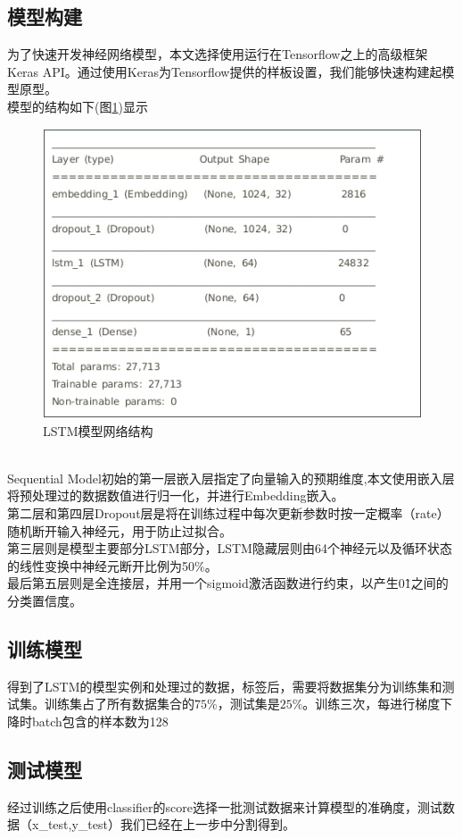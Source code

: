 \subsection{模型构建}
为了快速开发神经网络模型，本文选择使用运行在Tensorflow之上的高级框架Keras API。通过使用Keras为Tensorflow提供的样板设置，我们能够快速构建起模型原型。
\\\indent{}模型的结构如下(图\ref{fig:LSTM})显示
\begin{figure}[!h]
    \setlength{\abovecaptionskip}{0.cm}
    \setlength{\belowcaptionskip}{-0.cm}
    \centering
     \includegraphics[scale=0.65]{Figs/lstm.png}
    \caption{LSTM模型网络结构}
    \label{fig:LSTM}
\end{figure}
\\\indent{}Sequential Model初始的第一层嵌入层指定了向量输入的预期维度,本文使用嵌入层将预处理过的数据数值进行归一化，并进行Embedding嵌入。
\\\indent{}第二层和第四层Dropout层是将在训练过程中每次更新参数时按一定概率（rate）随机断开输入神经元，用于防止过拟合。
\\\indent{}第三层则是模型主要部分LSTM部分，LSTM隐藏层则由64个神经元以及循环状态的线性变换中神经元断开比例为50\%。
\\\indent{}最后第五层则是全连接层，并用一个sigmoid激活函数进行约束，以产生0\~1之间的分类置信度。
\subsection{训练模型}
得到了LSTM的模型实例和处理过的数据，标签后，需要将数据集分为训练集和测试集。训练集占了所有数据集合的$75\%$，测试集是$25\%$。训练三次，每进行梯度下降时batch包含的样本数为128
\subsection{测试模型}
经过训练之后使用classifier的score选择一批测试数据来计算模型的准确度，测试数据（x\_test,y\_test）我们已经在上一步中分割得到。
